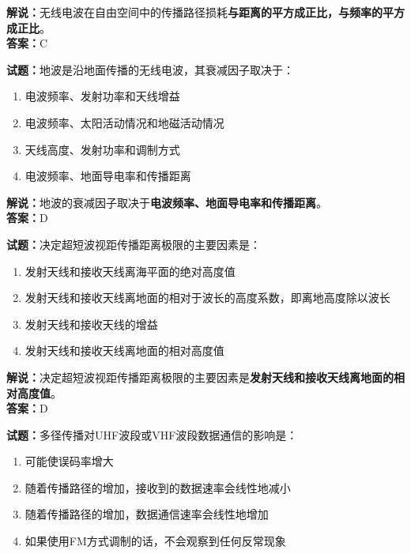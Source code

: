 \documentclass{ctexbook}
\begin{document}
\noindent\textbf{解说：}无线电波在自由空间中的传播路径损耗\textbf{与距离的平方成正比，与频率的平方成正比}。\\\noindent\textbf{答案：}C

\vspace{\baselineskip}

\noindent\textbf{试题：}地波是沿地面传播的无线电波，其衰减因子取决于：

\begin{enumerate}[leftmargin=3em]
  \item 电波频率、发射功率和天线增益
  \item 电波频率、太阳活动情况和地磁活动情况
  \item 天线高度、发射功率和调制方式
  \item 电波频率、地面导电率和传播距离
\end{enumerate}

\noindent\textbf{解说：}地波的衰减因子取决于\textbf{电波频率、地面导电率和传播距离}。\\\noindent\textbf{答案：}D

\vspace{\baselineskip}

\noindent\textbf{试题：}决定超短波视距传播距离极限的主要因素是：

\begin{enumerate}[leftmargin=3em]
  \item 发射天线和接收天线离海平面的绝对高度值
  \item 发射天线和接收天线离地面的相对于波长的高度系数，即离地高度除以波长
  \item 发射天线和接收天线的增益
  \item 发射天线和接收天线离地面的相对高度值
\end{enumerate}

\noindent\textbf{解说：}决定超短波视距传播距离极限的主要因素是\textbf{发射天线和接收天线离地面的相对高度值}。\\\noindent\textbf{答案：}D

\vspace{\baselineskip}

\noindent\textbf{试题：}多径传播对UHF波段或VHF波段数据通信的影响是：

\begin{enumerate}[leftmargin=3em]
  \item 可能使误码率增大
  \item 随着传播路径的增加，接收到的数据速率会线性地减小
  \item 随着传播路径的增加，数据通信速率会线性地增加
  \item 如果使用FM方式调制的话，不会观察到任何反常现象
\end{enumerate}
\end{document}
